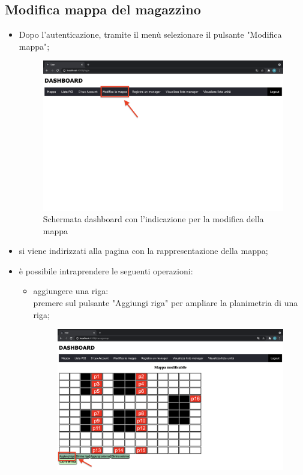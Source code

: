 \subsection{Modifica mappa del magazzino}
\begin{itemize}
    \item Dopo l'autenticazione, tramite il menù selezionare il pulsante "Modifica mappa";
    \begin{figure}[H]
        \centering
        \includegraphics[scale=0.12]{res/images/dashboard6.png}
        \caption{Schermata dashboard con l'indicazione per la modifica della mappa}
    \end{figure}
    \item si viene indirizzati alla pagina con la rappresentazione della mappa;
    \item è possibile intraprendere le seguenti operazioni:
        \begin{itemize}
            \item aggiungere una riga: \\premere sul pulsante "Aggiungi riga" per ampliare la planimetria di una riga;
            \begin{figure}[H]
                \centering
                \includegraphics[scale=0.12]{res/images/modificamappa1.png}

\end{figure}
\end{itemize}
\end{itemize}
